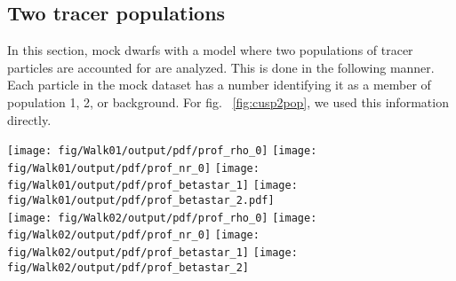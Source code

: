 \subsection{Two tracer populations}

In this section, mock dwarfs with a model where two populations of
tracer particles are accounted for are analyzed. This is done in the
following manner. Each particle in the mock dataset has a number
identifying it as a member of population 1, 2, or background. For fig.
~\ref{fig:cusp2pop}, we used this information directly.

\begin{figure*}
    \begin{center}
        \texttt{[image: fig/Walk01/output/pdf/prof\_rho\_0]}\hspace{-3mm}
        \texttt{[image: fig/Walk01/output/pdf/prof\_nr\_0]}\hspace{-3mm}
        \texttt{[image: fig/Walk01/output/pdf/prof\_betastar\_1]}\hspace{-3mm}
        \texttt{[image: fig/Walk01/output/pdf/prof\_betastar\_2.pdf]}\\

        \texttt{[image: fig/Walk02/output/pdf/prof\_rho\_0]}\hspace{-3mm}
        \texttt{[image: fig/Walk02/output/pdf/prof\_nr\_0]}\hspace{-3mm}
        \texttt{[image: fig/Walk02/output/pdf/prof\_betastar\_1]}\hspace{-3mm}
        \texttt{[image: fig/Walk02/output/pdf/prof\_betastar\_2]}\\

        \caption{Reconstructed density and density slope for the 2pop
          core model (top) and 2pop cusp model (bottom), with two
          tracer populations with half light radii marked by the
          vertical green lines. Lines are as in Figure
          \ref{fig:singlepop}. We encorporated a $\beta*(r)\geq0$
          prior here to speed up convergence.}
        \label{fig:cusp2pop}
    \end{center}
\end{figure*}

